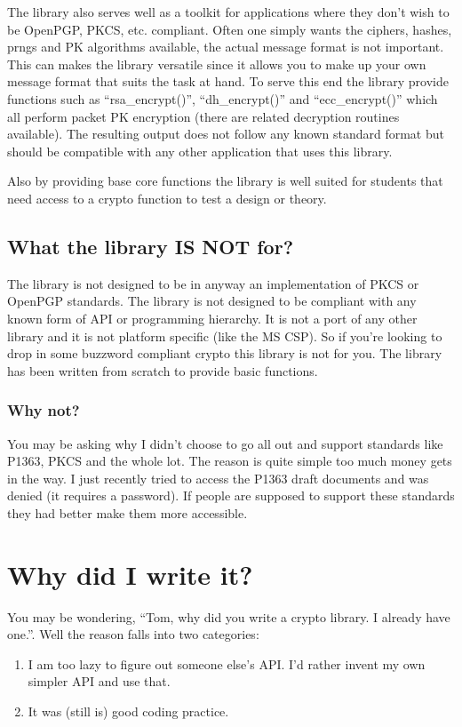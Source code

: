 \documentclass{book}
\begin{document}
The library also serves well as a toolkit for applications where they don't wish to be OpenPGP, PKCS, etc. compliant.
Often one simply wants the ciphers, hashes, prngs and PK algorithms available, the actual message format is not important.  
This can makes the library versatile since it allows you to make up your own message format that suits the task at hand.  
To serve this end the library provide functions such as ``rsa\_encrypt()'', ``dh\_encrypt()'' and ``ecc\_encrypt()'' which 
all perform packet PK encryption (there are related decryption routines available).  The resulting output does not follow
any known standard format but should be compatible with any other application that uses this library.

Also by providing base core functions the library is well suited for students that need access to a crypto function 
to test a design or theory.

\subsection{What the library IS NOT for?}

The library is not designed to be in anyway an implementation of PKCS or OpenPGP standards.  The library is not designed 
to be compliant with any known form of API or programming hierarchy.  It is not a port of any other library and it is not
platform specific (like the MS CSP).  So if you're looking to drop in some buzzword compliant crypto this library is not
for you.  The library has been written from scratch to provide basic functions.

\subsubsection{Why not?}
You may be asking why I didn't choose to go all out and support standards like P1363, PKCS and the whole lot.  The reason
is quite simple too much money gets in the way.  I just recently tried to access the P1363 draft documents and was denied (it 
requires a password).  If people are supposed to support these standards they had better make them more accessible.

\section{Why did I write it?}
You may be wondering, ``Tom, why did you write a crypto library.  I already have one.''.  Well the reason falls into
two categories:
\begin{enumerate}
    \item I am too lazy to figure out someone else's API.  I'd rather invent my own simpler API and use that.
    \item It was (still is) good coding practice.
\end{enumerate}
\end{document}
